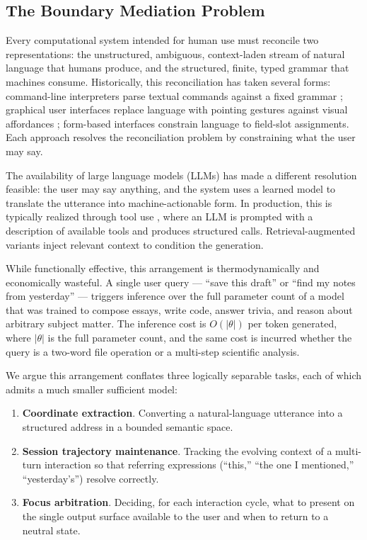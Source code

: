 \documentclass[11pt,a4paper]{article}
\theoremstyle{definition}
\theoremstyle{remark}
\begin{document}
\subsection{The Boundary Mediation Problem}

Every computational system intended for human use must reconcile two representations: the unstructured, ambiguous, context-laden stream of natural language that humans produce, and the structured, finite, typed grammar that machines consume. Historically, this reconciliation has taken several forms: command-line interpreters parse textual commands against a fixed grammar \citep{ritchie1978unix}; graphical user interfaces replace language with pointing gestures against visual affordances \citep{engelbart1962augmenting, sutherland1963sketchpad}; form-based interfaces constrain language to field-slot assignments. Each approach resolves the reconciliation problem by constraining what the user may say.

The availability of large language models (LLMs) \citep{brown2020gpt3, touvron2023llama, achiam2023gpt4} has made a different resolution feasible: the user may say anything, and the system uses a learned model to translate the utterance into machine-actionable form. In production, this is typically realized through tool use \citep{schick2024toolformer, yao2022react}, where an LLM is prompted with a description of available tools and produces structured calls. Retrieval-augmented variants \citep{lewis2020rag} inject relevant context to condition the generation.

While functionally effective, this arrangement is thermodynamically and economically wasteful. A single user query --- ``save this draft'' or ``find my notes from yesterday'' --- triggers inference over the full parameter count of a model that was trained to compose essays, write code, answer trivia, and reason about arbitrary subject matter. The inference cost is $O(|\theta|)$ per token generated, where $|\theta|$ is the full parameter count, and the same cost is incurred whether the query is a two-word file operation or a multi-step scientific analysis.

We argue this arrangement conflates three logically separable tasks, each of which admits a much smaller sufficient model:

\begin{enumerate}
    \item \textbf{Coordinate extraction}. Converting a natural-language utterance into a structured address in a bounded semantic space.
    \item \textbf{Session trajectory maintenance}. Tracking the evolving context of a multi-turn interaction so that referring expressions (``this,'' ``the one I mentioned,'' ``yesterday's'') resolve correctly.
    \item \textbf{Focus arbitration}. Deciding, for each interaction cycle, what to present on the single output surface available to the user and when to return to a neutral state.
\end{enumerate}
\end{document}
